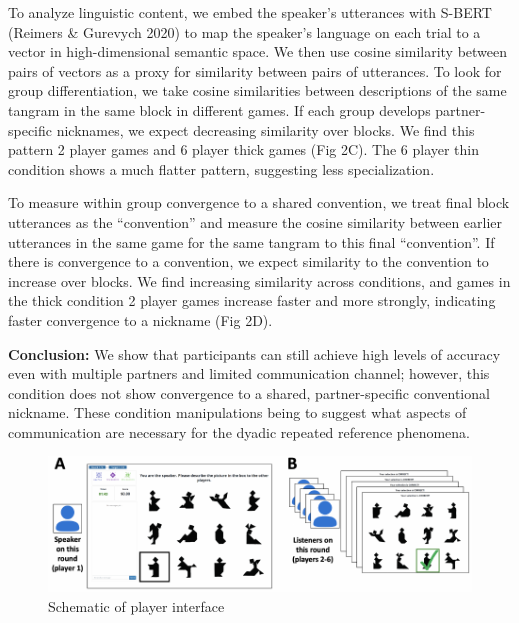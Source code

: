 \documentclass[11pt,a4paper]{article}
\begin{document}
To analyze linguistic content, we embed the speaker's utterances with S-BERT (Reimers \& Gurevych 2020) to map the speaker's language on each trial to a vector in high-dimensional semantic space. We then use cosine similarity between pairs of vectors as a proxy for similarity between pairs of utterances. To look for group differentiation, we take cosine similarities between descriptions of the same tangram in the same block in different games. If each group develops partner-specific nicknames, we expect decreasing similarity over blocks. We find this pattern 2 player games and 6 player thick games (Fig 2C). The 6 player thin condition shows a much flatter pattern, suggesting less specialization. 

To measure within group convergence to a shared convention, we treat final block utterances as the ``convention'' and measure the cosine similarity between earlier utterances in the same game for the same tangram to this final ``convention''. If there is convergence to a convention, we expect similarity to the convention to increase over blocks. We find increasing similarity across conditions, and games in the thick condition 2 player games increase faster and more strongly, indicating faster convergence to a nickname (Fig 2D). 

\textbf{Conclusion:} We show that participants can still achieve high levels of accuracy even with multiple partners and limited communication channel; however, this condition does not show convergence to a shared, partner-specific conventional nickname. These condition manipulations being to suggest what aspects of communication are necessary for the dyadic repeated reference phenomena.

\newpage

\begin{figure}
	\includegraphics[width=\textwidth]{../images/interface-1.pdf}
	\caption{Schematic of player interface}
\end{figure}
\end{document}
